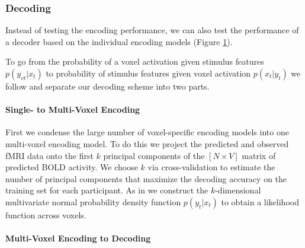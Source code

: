 \begin{figure}
 \label{fig:decoding_scheme}
\end{figure}


\subsubsection*{Decoding}

Instead of testing the encoding performance, we can also test the performance
of a decoder based on the individual encoding models \citep{NG11} (Figure
\ref{fig:decoding_scheme}).

To go from the probability of a voxel activation
given stimulus features $p(y_{vt}|x_{t})$ to probability of stimulus features
given voxel activation $p(x_{t}|y_{t})$ we follow \citet{NG09} and separate our
decoding scheme into two parts. 

\paragraph{Single- to Multi-Voxel Encoding}

First we condense the large number of voxel-specific encoding models into one
multi-voxel encoding model.  To do this we project the predicted and observed
f{MRI} data onto the first $k$ principal components of the $[N\times V]$ matrix
of predicted BOLD activity. We choose $k$ via cross-validation to estimate the
number of principal components that maximize the decoding accuracy on the
training set for each participant.
As in \citet{NG09} we construct the $k$-dimensional multivariate normal
probability density function $p(y_{t}|x_{t})$ to obtain a likelihood function
across voxels. 

\paragraph{Multi-Voxel Encoding to Decoding}

